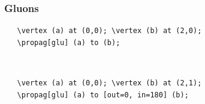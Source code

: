 \documentclass[10pt,letterpaper,twoside,notitlepage]{article}
\numberwithin{figure}{section}
\begin{document}
\subsubsection*{Gluons}
%
\begin{minipage}{0.7\linewidth}
\vercol\begin{verbatim}
   \vertex (a) at (0,0); \vertex (b) at (2,0);
   \propag[glu] (a) to (b);
\end{verbatim}\txcol
\end{minipage}
%
\begin{minipage}{0.25\linewidth}
\end{minipage}
\\
%
\begin{minipage}{0.7\linewidth}
\vercol\begin{verbatim}
   \vertex (a) at (0,0); \vertex (b) at (2,1);
   \propag[glu] (a) to [out=0, in=180] (b);
\end{verbatim}\txcol
\end{minipage}
%
\begin{minipage}{0.25\linewidth}
\end{minipage}
\\
%
\end{document}
